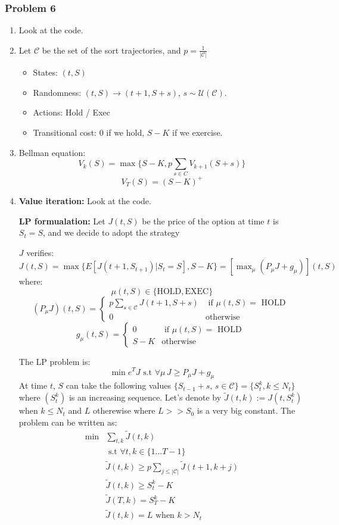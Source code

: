 \documentclass[12pt]{article}
\newcommand{\Q}[1]{\subsubsection*{Problem #1}}
\begin{document}
\Q{6}
\begin{enumerate}
\item Look at the code.

\item
  Let $\mathcal C$ be the set of the sort trajectories, and $p = \frac1{ |\mathcal C|}$
  \begin{itemize}
  \item States: $(t, S)$
  \item Randomness: $(t, S) \rightarrow (t+1, S+s)$, $s \sim \mathcal U(\mathcal C)$.
  \item Actions: Hold / Exec
  \item Transitional cost: $0$ if we hold, $S - K$ if we exercise.
  \end{itemize}
\item Bellman equation:
  $$V_k(S) = \max\{S - K, p \sum_{s \in C} V_{k+1}(S + s) \}$$
  $$V_T(S) = (S-K)^+$$
\item
  \textbf{Value iteration:} Look at the code.
  
  \textbf{LP formualation:}
  Let $J(t, S)$ be the price of the option at time $t$ is $S_t = S$,
  and we decide to adopt the strategy 

  $J$ verifies: $J(t, S) = \max \{ E[J(t+1, S_{t+1}) | S_t = S], S - K \} = [\max_{\mu} (P_{\mu}J + g_\mu) ](t,S) $
  where:
  $$\mu(t, S) \in \{ \text{HOLD}, \text{EXEC} \}$$
  \[ (P_\mu J)(t, S) = \left\{
      \begin{array}{cc}
        p \sum_{s \in \mathcal C} J(t+1, S+s) & \text{ if $\mu(t, S) = $ HOLD } \\
        0 & \text{otherwise}
      \end{array}
    \right.
  \]
  \[
    g_\mu(t, S) = \left\{
      \begin{array}{cc}
        0 & \text{ if $\mu(t, S) = $ HOLD } \\
        S - K & \text{otherwise}
      \end{array}
    \right.
  \]

  The LP problem is:
  $$\min e^T J \text{ s.t } \forall \mu \, J \ge P_\mu J + g_\mu$$
  At time $t$, $S$ can take the following values $\{ S_{t-1} + s,\, s \in \mathcal C\} = \{ S_t^k, k \le N_t \}$ where $(S_t^k)$ is an increasing sequence. Let's denote by $\tilde J(t, k) := J(t, S_t^k)$ when $k \le N_t$ and $L$ otherewise where $L >> S_0$ is a very big constant.
  The problem can be written as:
  \begin{align*}
    \min &\sum_{t, k} \tilde J(t, k) \\
         &\text{ s.t } \forall t, k \in \{1...T-1\}\\
         & \tilde J(t, k) \ge p \sum_{j \le |\mathcal C|} \tilde J(t+1, k+j)  \\
         & \tilde J(t, k) \ge S_t^k - K\\
         & \tilde J(T, k) = S_T^k - K \\
         & \tilde J(t, k) = L \text{ when } k > N_t\\
  \end{align*}


\end{enumerate}
\end{document}
